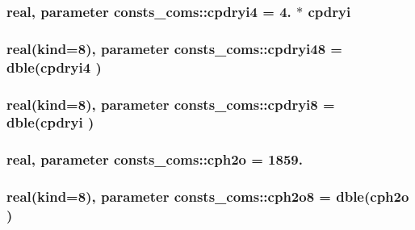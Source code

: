 \subsubsection[{\texorpdfstring{cpdryi4}{cpdryi4}}]{\setlength{\rightskip}{0pt plus 5cm}real, parameter consts\+\_\+coms\+::cpdryi4 = 4. $\ast$ {\bf cpdryi}}\hypertarget{namespaceconsts__coms_ab8bcfd7d3be31463cbbd8d4977ea747c}{}\label{namespaceconsts__coms_ab8bcfd7d3be31463cbbd8d4977ea747c}
\subsubsection[{\texorpdfstring{cpdryi48}{cpdryi48}}]{\setlength{\rightskip}{0pt plus 5cm}real(kind=8), parameter consts\+\_\+coms\+::cpdryi48 = dble({\bf cpdryi4} )}\hypertarget{namespaceconsts__coms_a1607f8f37a44679745422794546587ce}{}\label{namespaceconsts__coms_a1607f8f37a44679745422794546587ce}
\subsubsection[{\texorpdfstring{cpdryi8}{cpdryi8}}]{\setlength{\rightskip}{0pt plus 5cm}real(kind=8), parameter consts\+\_\+coms\+::cpdryi8 = dble({\bf cpdryi} )}\hypertarget{namespaceconsts__coms_ad41aea4d8cdd1fc3ef22d6a0a846ead0}{}\label{namespaceconsts__coms_ad41aea4d8cdd1fc3ef22d6a0a846ead0}
\subsubsection[{\texorpdfstring{cph2o}{cph2o}}]{\setlength{\rightskip}{0pt plus 5cm}real, parameter consts\+\_\+coms\+::cph2o = 1859.}\hypertarget{namespaceconsts__coms_ab6845975c5a7d568270b99fac73cecee}{}\label{namespaceconsts__coms_ab6845975c5a7d568270b99fac73cecee}
\subsubsection[{\texorpdfstring{cph2o8}{cph2o8}}]{\setlength{\rightskip}{0pt plus 5cm}real(kind=8), parameter consts\+\_\+coms\+::cph2o8 = dble({\bf cph2o} )}\hypertarget{namespaceconsts__coms_a90db8cf818bbde30510ef7860ff55303}{}\label{namespaceconsts__coms_a90db8cf818bbde30510ef7860ff55303}
